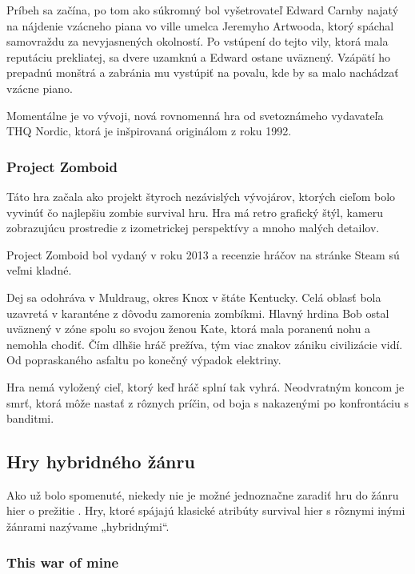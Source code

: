 \documentclass[10pt,oneoside,slovak,a4paper]{article}
\begin{document}
Príbeh sa začína, po tom ako súkromný bol vyšetrovateľ Edward Carnby najatý na nájdenie vzácneho piana vo ville umelca Jeremyho Artwooda, ktorý spáchal samovraždu za nevyjasnených okolností. Po vstúpení do tejto vily, ktorá mala reputáciu prekliatej, sa dvere uzamknú a Edward ostane uväznený. Vzápätí ho prepadnú monštrá a zabránia mu vystúpiť na povalu, kde by sa malo nachádzať vzácne piano.\cite{Swan}

Momentálne je vo vývoji, nová  rovnomenná hra od svetoznámeho vydavateľa THQ Nordic, ktorá je inšpirovaná originálom z roku 1992.\cite{Alone}

\subsubsection{Project Zomboid}

Táto  hra začala ako projekt štyroch nezávislých vývojárov, ktorých cieľom bolo vyvinúť čo najlepšiu zombie survival hru. Hra má retro grafický štýl, kameru zobrazujúcu prostredie z izometrickej perspektívy a mnoho malých detailov.\cite{Mosel}

Project Zomboid bol vydaný v roku 2013 a recenzie hráčov na stránke Steam sú veľmi kladné.\cite{Zomboid}

Dej sa odohráva v Muldraug, okres Knox  v štáte Kentucky. Celá oblasť bola uzavretá v karanténe z dôvodu zamorenia zombíkmi.  Hlavný hrdina Bob ostal uväznený v zóne spolu so svojou ženou Kate, ktorá mala poranenú nohu a nemohla chodiť.
Čím dlhšie hráč prežíva, tým viac znakov zániku civilizácie vidí. Od popraskaného asfaltu po konečný výpadok elektriny. 

Hra nemá vyložený cieľ, ktorý keď hráč splní tak vyhrá. Neodvratným koncom je smrť, ktorá môže nastať z rôznych príčin, od boja s nakazenými po konfrontáciu s banditmi.\cite{Mosel}







\subsection{Hry hybridného žánru}

Ako už bolo spomenuté, niekedy nie je možné  jednoznačne zaradiť hru do žánru hier o prežitie . Hry, ktoré spájajú klasické atribúty survival hier s rôznymi inými žánrami nazývame „hybridnými“. 

\subsubsection{This war of mine}
\end{document}
